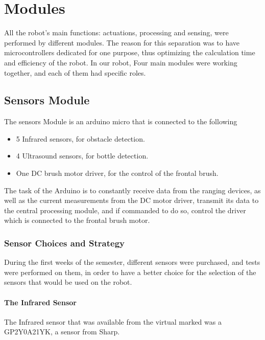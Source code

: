 %
%   
%

\chapter{Modules}

All the robot's main functions: actuations, processing and sensing, were performed by different modules. The reason for this separation was to have microcontrollers dedicated for one purpose, thus optimizing the calculation time and efficiency of the robot. In our robot, Four main modules were working together, and each of them had specific roles.

\section{Sensors Module}
The sensors Module is an arduino micro that is connected to the following
\begin{itemize}
\item 5 Infrared sensors, for obstacle detection.
\item 4 Ultrasound sensors, for bottle detection.
\item One DC brush motor driver, for the control of the frontal brush.
\end{itemize}

The task of the Arduino is to constantly receive data from the ranging devices, as well as the current measurements from the DC motor driver, transmit its data to the central processing module, and if commanded to do so, control the driver which is connected to the frontal brush motor. 

\subsection{Sensor Choices and Strategy}
During the first weeks of the semester, different sensors were purchased, and tests were performed on them, in order to have a better choice for the selection of the sensors that would be used on the robot. 


\subsubsection{The Infrared Sensor}
The Infrared sensor that was available from the virtual marked was a GP2Y0A21YK, a sensor from Sharp. 

